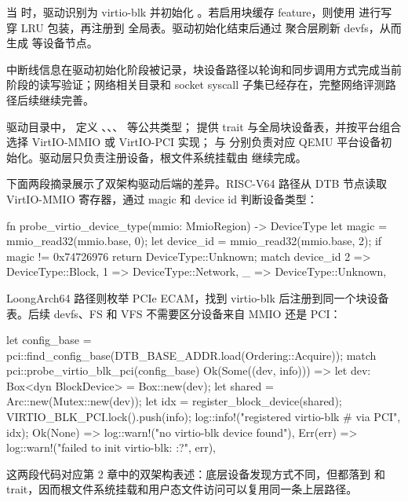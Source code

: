 当  时，驱动识别为 virtio-blk 并初始化 。若启用块缓存 feature，则使用  进行写穿 LRU 包装，再注册到  全局表。驱动初始化结束后通过  聚合层刷新 devfs，从而生成  等设备节点。

中断线信息在驱动初始化阶段被记录，块设备路径以轮询和同步调用方式完成当前阶段的读写验证；网络相关目录和 socket syscall 子集已经存在，完整网络评测路径后续继续完善。

驱动目录中， 定义 、、、 等公共类型； 提供  trait 与全局块设备表，并按平台组合选择 VirtIO-MMIO 或 VirtIO-PCI 实现； 与  分别负责对应 QEMU 平台设备初始化。驱动层只负责注册设备，根文件系统挂载由  继续完成。


下面两段摘录展示了双架构驱动后端的差异。RISC-V64 路径从 DTB 节点读取 VirtIO-MMIO 寄存器，通过 magic 和 device id 判断设备类型：

\begin{rustcode}
fn probe_virtio_device_type(mmio: MmioRegion) -> DeviceType {
    let magic = mmio_read32(mmio.base, 0);
    let device_id = mmio_read32(mmio.base, 2);
    if magic != 0x74726976 {
        return DeviceType::Unknown;
    }
    match device_id {
        2 => DeviceType::Block,
        1 => DeviceType::Network,
        _ => DeviceType::Unknown,
    }
}
\end{rustcode}

LoongArch64 路径则枚举 PCIe ECAM，找到 virtio-blk 后注册到同一个块设备表。后续 devfs、FS 和 VFS 不需要区分设备来自 MMIO 还是 PCI：

\begin{rustcode}
let config_base = pci::find_config_base(DTB_BASE_ADDR.load(Ordering::Acquire));
match pci::probe_virtio_blk_pci(config_base) {
    Ok(Some((dev, info))) => {
        let dev: Box<dyn BlockDevice> = Box::new(dev);
        let shared = Arc::new(Mutex::new(dev));
        let idx = register_block_device(shared);
        VIRTIO_BLK_PCI.lock().push(info);
        log::info!("registered virtio-blk #{} via PCI", idx);
    }
    Ok(None) => log::warn!("no virtio-blk device found"),
    Err(err) => log::warn!("failed to init virtio-blk: {:?}", err),
}
\end{rustcode}

这两段代码对应第 2 章中的双架构表述：底层设备发现方式不同，但都落到  和  trait，因而根文件系统挂载和用户态文件访问可以复用同一条上层路径。

